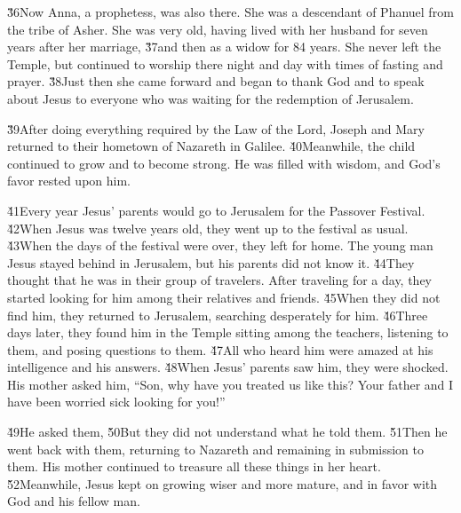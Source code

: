\v{36}Now Anna, a prophetess, was also there. She was a descendant of Phanuel from the tribe of Asher. She was very old, having lived with her husband for seven years after her marriage, \v{37}and then as a widow for 84 years. She never left the Temple, but continued to worship there night and day with times of fasting and prayer. \v{38}Just then she came forward and began to thank God and to speak about Jesus to everyone who was waiting for the redemption of Jerusalem.

\v{39}After doing everything required by the Law of the Lord, Joseph and Mary returned to their hometown of Nazareth in Galilee. \v{40}Meanwhile, the child continued to grow and to become strong. He was filled with wisdom, and God's favor rested upon him.

\v{41}Every year Jesus' parents would go to Jerusalem for the Passover Festival. \v{42}When Jesus was twelve years old, they went up to the festival as usual. \v{43}When the days of the festival were over, they left for home. The young man Jesus stayed behind in Jerusalem, but his parents did not know it. \v{44}They thought that he was in their group of travelers. After traveling for a day, they started looking for him among their relatives and friends. \v{45}When they did not find him, they returned to Jerusalem, searching desperately for him. \v{46}Three days later, they found him in the Temple sitting among the teachers, listening to them, and posing questions to them. \v{47}All who heard him were amazed at his intelligence and his answers. \v{48}When Jesus' parents saw him, they were shocked. His mother asked him, ``Son, why have you treated us like this? Your father and I have been worried sick looking for you!''

\v{49}He asked them,  \v{50}But they did not understand what he told them. \v{51}Then he went back with them, returning to Nazareth and remaining in submission to them. His mother continued to treasure all these things in her heart. \v{52}Meanwhile, Jesus kept on growing wiser and more mature, and in favor with God and his fellow man.

